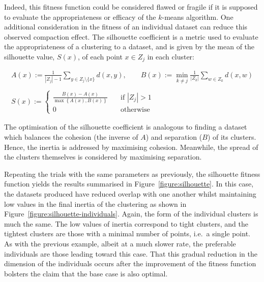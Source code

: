 Indeed, this fitness function could be considered flawed or fragile if it is
supposed to evaluate the appropriateness or efficacy of the \(k\)-means
algorithm. One additional consideration in the fitness of an individual dataset
can reduce this observed compaction effect. The silhouette coefficient is a
metric used to evaluate the appropriateness of a clustering to a dataset, and is
given by the mean of the silhouette value, \(S(x)\), of each point \(x \in Z_j\)
in each cluster:

\begin{equation}
    \begin{gathered}
        A(x) := \frac{1}{|Z_j| - 1} \sum_{y \in Z_j \setminus \{x\}} d(x, y),
        \qquad B(x) := \min_{k \neq j} \frac{1}{|Z_k|} \sum_{w \in Z_k} d(x, w)
        \\\\
        S(x) := 
            \begin{cases}
                \frac{B(x) - A(x)}{\max\left\{A(x), B(x)\right\}}
                &\quad \text{if } |Z_j| > 1\\
                0 &\quad \text{otherwise}
            \end{cases}
    \end{gathered}
\end{equation}

The optimisation of the silhouette coefficient is analogous to finding a dataset
which balances the cohesion (the inverse of \(A\)) and separation (\(B\)) of its
clusters. Hence, the inertia is addressed by maximising cohesion. Meanwhile, the
spread of the clusters themselves is considered by maximising separation.

Repeating the trials with the same parameters as previously, the silhouette
fitness function yields the results summarised in
Figure~\ref{figure:silhouette}. In this case, the datasets produced have reduced
overlap with one another whilst maintaining low values in the final inertia of
the clustering as shown in Figure~\ref{figure:silhouette-individuals}. Again,
the form of the individual clusters is much the same. The low values of inertia
correspond to tight clusters, and the tightest clusters are those with a minimal
number of points, i.e.\ a single point. As with the previous example, albeit at
a much slower rate, the preferable individuals are those leading toward this
case. That this gradual reduction in the dimension of the individuals occurs
after the improvement of the fitness function bolsters the claim that the base
case is also optimal.

